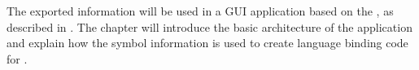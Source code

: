 The exported information will be used in a GUI application based on the , as described in . The chapter will introduce the basic architecture of the application and explain how the symbol information is used to create language binding code for .



